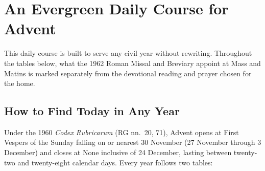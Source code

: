 \section{An Evergreen Daily Course for Advent}\label{app:daily-course}

This daily course is built to serve any civil year without rewriting. Throughout
the tables below, what the 1962 Roman Missal and Breviary appoint at Mass and
Matins is marked separately from the devotional reading and prayer chosen for
the home.

\subsection{How to Find Today in Any Year}

Under the 1960 \textit{Codex Rubricarum} (RG nn.~20, 71), Advent opens at First
Vespers of the Sunday falling on or nearest 30 November (27 November through
3 December) and closes at None inclusive of 24 December, lasting between
twenty-two and twenty-eight calendar days. Every year follows two tables:

